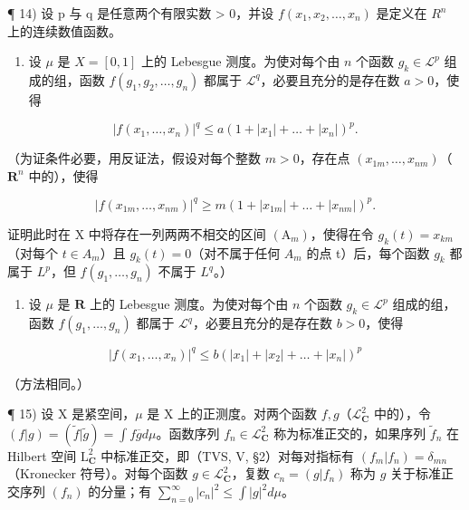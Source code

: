 ¶ 14) 设 p 与 q 是任意两个有限实数 \textgreater{} 0，并设 \(f(x_{1}, x_{2}, \ldots, x_{n})\) 是定义在 \(R^{n}\) 上的连续数值函数。

\begin{enumerate}
\def\labelenumi{\alph{enumi})}
\tightlist
\item
  设 \(\mu\) 是 \(X = [0,1]\) 上的 Lebesgue 测度。为使对每个由 \(n\) 个函数 \(g_k \in \mathcal{L}^p\) 组成的组，函数 \(f(g_1, g_2, \ldots, g_n)\) 都属于 \(\mathcal{L}^q\)，必要且充分的是存在数 \(a > 0\)，使得
\end{enumerate}

\[
\left| f \left(x _ {1}, \dots , x _ {n}\right) \right| ^ {q} \leqslant a \left(1 + \left| x _ {1} \right| + \dots + \left| x _ {n} \right|\right) ^ {p}.
\]

（为证条件必要，用反证法，假设对每个整数 \(m > 0\)，存在点 \((x_{1m},\ldots ,x_{nm})\)（\(\mathbf{R}^n\) 中的），使得

\[
| f (x _ {1 m}, \dots , x _ {n m}) | ^ {q} \geqslant m (1 + | x _ {1 m} | + \dots + | x _ {n m} |) ^ {p}.
\]

证明此时在 X 中将存在一列两两不相交的区间 \((\mathrm{A}_{m})\)，使得在令 \(g_{k}(t)=x_{km}\)（对每个 \(t\in A_{m}\)）且 \(g_{k}(t)=0\)（对不属于任何 \(A_{m}\) 的点 t）后，每个函数 \(g_{k}\) 都属于 \(L^{p}\)，但 \(f(g_{1},\ldots,g_{n})\) 不属于 \(L^{q}\)。）

\begin{enumerate}
\def\labelenumi{\alph{enumi})}
\setcounter{enumi}{1}
\tightlist
\item
  设 \(\mu\) 是 \(\mathbf{R}\) 上的 Lebesgue 测度。为使对每个由 \(n\) 个函数 \(g_k \in \mathcal{L}^p\) 组成的组，函数 \(f(g_1, \ldots, g_n)\) 都属于 \(\mathcal{L}^q\)，必要且充分的是存在数 \(b > 0\)，使得
\end{enumerate}

\[
\left| f \left(x _ {1}, \dots , x _ {n}\right) \right| ^ {q} \leqslant b \left(\left| x _ {1} \right| + \left| x _ {2} \right| + \dots + \left| x _ {n} \right|\right) ^ {p}
\]

（方法相同。）

¶ 15) 设 X 是紧空间，\(\mu\) 是 X 上的正测度。对两个函数 \(f, g\)（\(\mathcal{L}_{\mathbf{C}}^{2}\) 中的），令 \((f|g) = (\widetilde{f}|\widetilde{g}) = \int f\overline{g} d\mu\)。函数序列 \(f_{n} \in \mathcal{L}_{\mathbf{C}}^{2}\) 称为标准正交的，如果序列 \(\widetilde{f}_{n}\) 在 Hilbert 空间 \(\mathrm{L}_{\mathbf{C}}^{2}\) 中标准正交，即（TVS, V, §2）对每对指标有 \((f_{m}|f_{n}) = \delta_{mn}\)（Kronecker 符号）。对每个函数 \(g \in \mathcal{L}_{\mathbf{C}}^{2}\)，复数 \(c_{n} = (g|f_{n})\) 称为 \(g\) 关于标准正交序列 \((f_{n})\) 的分量；有 \(\sum_{n=0}^{\infty} |c_{n}|^{2} \leqslant \int |g|^{2} d\mu\)。

